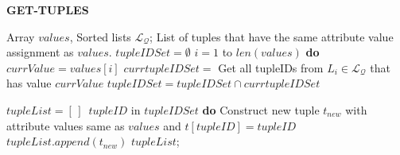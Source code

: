 
\begin{algorithm}[htb]
\caption{{\bf GET-TUPLES}}
\begin{algorithmic}[1]
\label{alg:topDownGetTuples}
 Array $values$, Sorted lists $\mathcal{L_Q}$; 
 List of tuples that have the same attribute value assignment as $values$.
\STATE $tupleIDSet = \emptyset$
 $i = 1$ to $len(values)$ {\bf do}
    \STATE \hindent[2] $currValue = values[i]$
    \STATE \hindent[2] $currtupleIDSet = $ Get all tupleIDs from $L_i \in \mathcal{L_Q}$ that has value $currValue$
    \STATE \hindent[2] $tupleIDSet = tupleIDSet \cap currtupleIDSet$

\STATE $tupleList = [\,]\,$
 $tupleID$ in $tupleIDSet$ {\bf do}
    \STATE \hindent[2] Construct new tuple $t_{new}$ with attribute values same as $values$ and $t[tupleID] = tupleID$
    \STATE \hindent[2] $tupleList.append(t_{new})$
 $tupleList$;
\end{algorithmic}
\end{algorithm}


